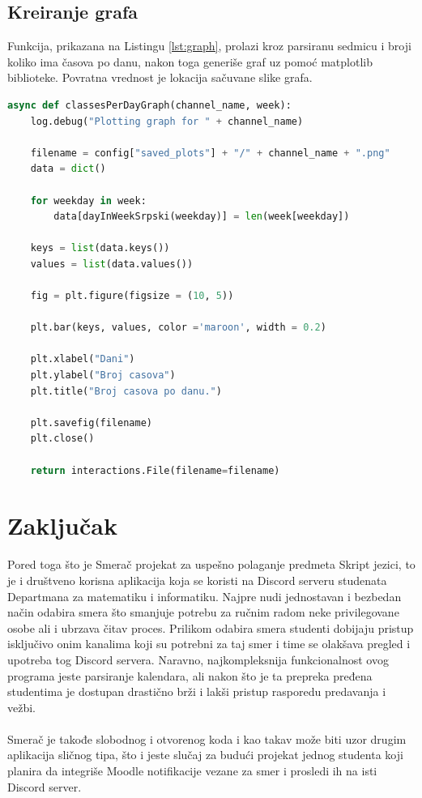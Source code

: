 \documentclass[a4paper,11pt]{article}
\begin{document}
\subsection{Kreiranje grafa}
Funkcija, prikazana na Listingu \ref{lst:graph}, prolazi kroz parsiranu sedmicu i broji koliko ima časova po danu, nakon toga generiše graf uz pomoć matplotlib\cite{matplotlib} biblioteke. Povratna vrednost je lokacija sačuvane slike grafa.
\begin{lstlisting}[language=Python, caption=Kreiranje grafa, label=lst:graph]
async def classesPerDayGraph(channel_name, week):
    log.debug("Plotting graph for " + channel_name)

    filename = config["saved_plots"] + "/" + channel_name + ".png"
    data = dict()

    for weekday in week:
        data[dayInWeekSrpski(weekday)] = len(week[weekday])

    keys = list(data.keys())
    values = list(data.values())

    fig = plt.figure(figsize = (10, 5))

    plt.bar(keys, values, color ='maroon', width = 0.2)

    plt.xlabel("Dani")
    plt.ylabel("Broj casova")
    plt.title("Broj casova po danu.")

    plt.savefig(filename)
    plt.close()

    return interactions.File(filename=filename)
\end{lstlisting}
\newpage
\section{Zaključak}
Pored toga što je Smerač projekat za uspešno polaganje predmeta Skript jezici, to je i društveno korisna aplikacija koja se koristi na Discord serveru studenata Departmana za matematiku i informatiku. Najpre nudi jednostavan i bezbedan način odabira smera što smanjuje potrebu za ručnim radom neke privilegovane osobe ali i ubrzava čitav proces. Prilikom odabira smera studenti dobijaju pristup isključivo onim kanalima koji su potrebni za taj smer i time se olakšava pregled i upotreba tog Discord servera. Naravno, najkompleksnija funkcionalnost ovog programa jeste parsiranje kalendara, ali nakon što je ta prepreka pređena studentima je dostupan drastično brži i lakši pristup rasporedu predavanja i vežbi.
\\\\
Smerač je takođe slobodnog i otvorenog koda i kao takav može biti uzor drugim aplikacija sličnog tipa, što i jeste slučaj za budući projekat jednog studenta koji planira da integriše Moodle notifikacije vezane za smer i prosledi ih na isti Discord server.
\newpage

\pagestyle{plain}
\renewcommand\refname{Literatura}


\end{document}
